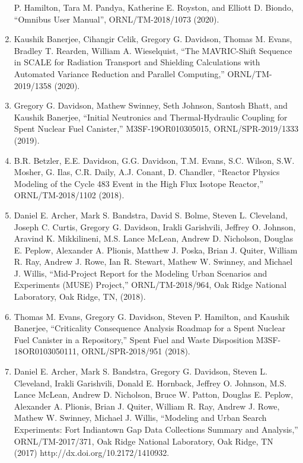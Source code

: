 \documentclass[letterpaper,11pt]{article}
\begin{document}
\begin{enumerate}
    P. Hamilton, Tara M. Pandya, Katherine E. Royston, and Elliott
    D. Biondo, ``Omnibus User Manual'', ORNL/TM-2018/1073 (2020).
  \item Kaushik Banerjee, Cihangir Celik, Gregory G. Davidson,
    Thomas M. Evans, Bradley T. Rearden, William A. Wieselquist,
    ``The MAVRIC-Shift Sequence in SCALE for Radiation Transport and
    Shielding Calculations with Automated Variance Reduction and
    Parallel Computing,'' ORNL/TM-2019/1358 (2020).
  \item Gregory G. Davidson, Mathew Swinney, Seth Johnson, Santosh
    Bhatt, and Kaushik Banerjee, ``Initial Neutronics and
    Thermal-Hydraulic Coupling for Spent Nuclear Fuel Canister,''
    M3SF-19OR010305015, ORNL/SPR-2019/1333 (2019).
  \item B.R. Betzler, E.E. Davidson, G.G. Davidson, T.M. Evans,
    S.C. Wilson, S.W. Mosher, G. Ilas, C.R. Daily, A.J. Conant,
    D. Chandler, ``Reactor Physics Modeling of the Cycle 483 Event
    in the High Flux Isotope Reactor,'' ORNL/TM-2018/1102 (2018).
  \item Daniel E. Archer, Mark S. Bandstra, David S. Bolme, Steven
    L. Cleveland, Joseph C. Curtis, Gregory G. Davidson, Irakli
    Garishvili, Jeffrey O. Johnson, Aravind K. Mikkilineni, M.S. Lance
    McLean, Andrew D. Nicholson, Douglas E. Peplow, Alexander
    A. Plionis, Matthew J. Poska, Brian J. Quiter, William R. Ray,
    Andrew J. Rowe, Ian R. Stewart, Mathew W. Swinney, and Michael
    J. Willis, ``Mid-Project Report for the Modeling Urban Scenarios and
    Experiments (MUSE) Project,'' ORNL/TM-2018/964, Oak Ridge National
    Laboratory, Oak Ridge, TN, (2018).
  \item Thomas M. Evans, Gregory G. Davidson, Steven P. Hamilton,
    and Kaushik Banerjee, ``Criticality Consequence Analysis Roadmap
    for a Spent Nuclear Fuel Canister in a Repository,'' Spent Fuel
    and Waste Disposition M3SF-18OR0103050111, ORNL/SPR-2018/951
    (2018). 
  \item Daniel E. Archer, Mark S. Bandstra, Gregory G. Davidson,
    Steven L. Cleveland, Irakli Garishvili, Donald E. Hornback,
    Jeffrey O. Johnson, M.S. Lance McLean, Andrew D. Nicholson, Bruce
    W. Patton, Douglas E. Peplow, Alexander A. Plionis, Brian
    J. Quiter, William R. Ray, Andrew J. Rowe, Mathew W. Swinney,
    Michael J. Willis, ``Modeling and Urban Search Experiments: Fort
    Indiantown Gap Data Collections Summary and Analysis,''
    ORNL/TM-2017/371, Oak Ridge National Laboratory, Oak Ridge, TN
    (2017) http://dx.doi.org/10.2172/1410932.

\end{enumerate}
\end{document}
